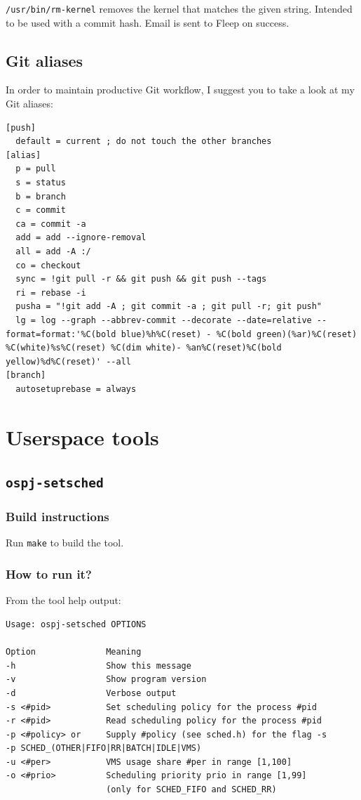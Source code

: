 \documentclass[]{report}
\begin{document}
\lstinline!/usr/bin/rm-kernel! removes the kernel that matches the given
string. Intended to be used with a commit hash. Email is sent to Fleep
on success.

\subsection{Git aliases}\label{git-aliases}

In order to maintain productive Git workflow, I suggest you to take a
look at my Git aliases:

\begin{lstlisting}[style=code, caption=.gitconfig]
[push]
  default = current ; do not touch the other branches
[alias]
  p = pull
  s = status
  b = branch 
  c = commit
  ca = commit -a
  add = add --ignore-removal
  all = add -A :/
  co = checkout
  sync = !git pull -r && git push && git push --tags
  ri = rebase -i
  pusha = "!git add -A ; git commit -a ; git pull -r; git push"
  lg = log --graph --abbrev-commit --decorate --date=relative --format=format:'%C(bold blue)%h%C(reset) - %C(bold green)(%ar)%C(reset) %C(white)%s%C(reset) %C(dim white)- %an%C(reset)%C(bold yellow)%d%C(reset)' --all
[branch]
  autosetuprebase = always
\end{lstlisting}

\section{Userspace tools}\label{userspace-tools}

\subsection{\lstinline!ospj-setsched!}\label{ospj-setsched}

\subsubsection{Build instructions}\label{build-instructions}

Run \lstinline!make! to build the tool.

\subsubsection{How to run it?}\label{how-to-run-it}

From the tool help output:

\begin{lstlisting}[style=simple]
Usage: ospj-setsched OPTIONS

Option              Meaning
-h                  Show this message
-v                  Show program version
-d                  Verbose output
-s <#pid>           Set scheduling policy for the process #pid
-r <#pid>           Read scheduling policy for the process #pid
-p <#policy> or     Supply #policy (see sched.h) for the flag -s
-p SCHED_(OTHER|FIFO|RR|BATCH|IDLE|VMS)
-u <#per>           VMS usage share #per in range [1,100]
-o <#prio>          Scheduling priority prio in range [1,99]
                    (only for SCHED_FIFO and SCHED_RR)
\end{lstlisting}
\end{document}
